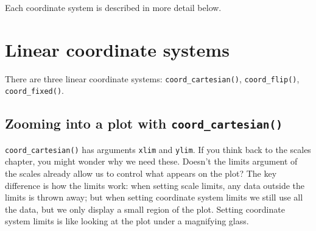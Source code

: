 Each coordinate system is described in more detail below.

\section{Linear coordinate systems}\label{sub:cartesian}

There are three linear coordinate systems: \texttt{coord\_cartesian()},
\texttt{coord\_flip()}, \texttt{coord\_fixed()}.
 

\subsection{\texorpdfstring{Zooming into a plot with
\texttt{coord\_cartesian()}}{Zooming into a plot with coord\_cartesian()}}\label{zooming-into-a-plot-with-coordux5fcartesian}

\texttt{coord\_cartesian()} has arguments \texttt{xlim} and
\texttt{ylim}. If you think back to the scales chapter, you might wonder
why we need these. Doesn't the limits argument of the scales already
allow us to control what appears on the plot? The key difference is how
the limits work: when setting scale limits, any data outside the limits
is thrown away; but when setting coordinate system limits we still use
all the data, but we only display a small region of the plot. Setting
coordinate system limits is like looking at the plot under a magnifying
glass. 

\begin{Shaded}
\begin{Highlighting}[]
\StringTok{ }\StringTok{ }
\StringTok{  }\NormalTok{() +}\StringTok{ }
\StringTok{  }\NormalTok{()}

\StringTok{ }\NormalTok{(} \NormalTok{(}\NormalTok{, }\NormalTok{))}
\StringTok{ }\NormalTok{(} \NormalTok{(}\NormalTok{, }\NormalTok{))}
\end{Highlighting}
\end{Shaded}

